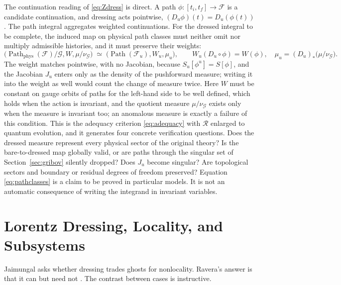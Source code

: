 \documentclass[11pt]{article}
\theoremstyle{plain}
\theoremstyle{definition}
\theoremstyle{remark}
\newcommand{\F}{\mathcal F}
\newcommand{\G}{\mathcal G}
\newcommand{\R}{\mathcal R}
\begin{document}
The continuation reading of \eqref{eq:Zdress} is direct. A path $\phi:[t_i,t_f]\to\F$ is a candidate continuation, and dressing acts pointwise, $(D_u\phi)(t)=D_u(\phi(t))$. The path integral aggregates weighted continuations. For the dressed integral to be complete, the induced map on physical path classes must neither omit nor multiply admissible histories, and it must preserve their weights:
\begin{equation}\label{eq:pathclasses}
\bigl(\operatorname{Path}_{\mathrm{phys}}(\F)/\G,W,\mu/\nu_\G\bigr)
\;\simeq\;
\bigl(\operatorname{Path}(\F_u),W_u,\mu_u\bigr),
\qquad W_u(D_u\circ\phi)=W(\phi),\quad \mu_u=(D_u)_*\bigl(\mu/\nu_\G\bigr).
\end{equation}
The weight matches pointwise, with no Jacobian, because $S_u[\phi^u]=S[\phi]$, and the Jacobian $J_u$ enters only as the density of the pushforward measure; writing it into the weight as well would count the change of measure twice. Here $W$ must be constant on gauge orbits of paths for the left-hand side to be well defined, which holds when the action is invariant, and the quotient measure $\mu/\nu_\G$ exists only when the measure is invariant too; an anomalous measure is exactly a failure of this condition. This is the adequacy criterion \eqref{eq:adequacy} with $\R$ enlarged to quantum evolution, and it generates four concrete verification questions. Does the dressed measure represent every physical sector of the original theory? Is the bare-to-dressed map globally valid, or are paths through the singular set of Section~\ref{sec:gribov} silently dropped? Does $J_u$ become singular? Are topological sectors and boundary or residual degrees of freedom preserved? Equation \eqref{eq:pathclasses} is a claim to be proved in particular models. It is not an automatic consequence of writing the integrand in invariant variables.

\section{Lorentz Dressing, Locality, and Subsystems}\label{sec:locality}

Jaimungal asks whether dressing trades ghosts for nonlocality. Ravera's answer is that it can but need not \cite{toe}. The contrast between cases is instructive.
\end{document}
